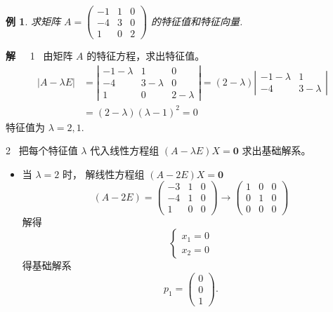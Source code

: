 \documentclass[13pt]{beamer}
\newtheorem{exa}{例}
\def\sol{{\bf 解~~ }}
\begin{document}
\begin{frame}
\begin{exa}
求矩阵 $A=\left(\begin{array}{ccc}-1 & 1 & 0 \\ -4 & 3 & 0 \\ 1 & 0 & 2\end{array}\right)$ 的特征值和特征向量.
\end{exa}
\sol 1~ 由矩阵 $A$ 的特征方程，求出特征值。
\[
\begin{aligned}
|A-\lambda E| &=\left|\begin{array}{ccc}
-1-\lambda & 1 & 0 \\
-4 & 3-\lambda & 0 \\
1 & 0 & 2-\lambda
\end{array}\right|=(2-\lambda)\left|\begin{array}{cc}
-1-\lambda & 1 \\
-4 & 3-\lambda
\end{array}\right| \\
&=(2-\lambda)(\lambda-1)^{2}=0
\end{aligned}
\]
特征值为 $\lambda=2,1$.
\end{frame}


\begin{frame}
2~ 把每个特征值 $\lambda$ 代入线性方程组 $(A-\lambda E) X=\mathbf{0}$
求出基础解系。
\begin{itemize}
	\item 当 $\lambda={2}$ 时， 解线性方程组 $(A-2 E) X=\mathbf{0}$
\[
(A-2 E)=\left(\begin{array}{ccc}
-3 & 1 & 0 \\
-4 & 1 & 0 \\
1 & 0 & 0
\end{array}\right) \rightarrow\left(\begin{array}{ccc}
1 & 0 & 0 \\
0 & 1 & 0 \\
0 & 0 & 0
\end{array}\right)
\]
解得
\[
\left\{\begin{array}{l}{x}_{1}={0} \\ {x}_{2}={0}\end{array}\right.
\]
得基础解系  
\[
{p}_{1}=\left(\begin{array}{l} {0} \\ {0} \\ {1}\end{array}\right).
\]
\end{itemize}
\end{frame}
\end{document}
